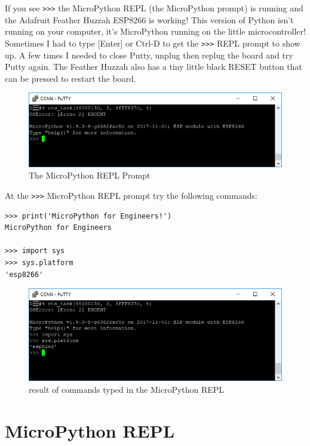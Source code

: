 \documentclass{book}
\makeatletter
\def\maxwidth{\ifdim\Gin@nat@width>\linewidth\linewidth
    \else\Gin@nat@width\fi}
\let\Oldincludegraphics\includegraphics
\renewcommand{\includegraphics}[1]{\Oldincludegraphics[width=.8\maxwidth]{#1}}
\makeatother
\begin{document}
If you see \lstinline!>>>! the MicroPython REPL (the MicroPython prompt)
is running and the Adafruit Feather Huzzah ESP8266 is working! This
version of Python isn't running on your computer, it's MicroPython
running on the little microcontroller! Sometimes I had to type
{[}Enter{]} or Ctrl-D to get the \lstinline!>>>! REPL prompt to show up.
A few times I needed to close Putty, unplug then replug the board and
try Putty again. The Feather Huzzah also has a tiny little black RESET
button that can be pressed to restart the board.

\begin{figure}
\centering
\includegraphics{images/REPL_prompt.PNG}
\caption{The MicroPython REPL Prompt}
\end{figure}

At the \lstinline!>>>! MicroPython REPL prompt try the following
commands:

\begin{lstlisting}
>>> print('MicroPython for Engineers!')
MicroPython for Engineers

>>> import sys
>>> sys.platform
'esp8266'
\end{lstlisting}

\begin{figure}
\centering
\includegraphics{images/sys_dot_platform.PNG}
\caption{result of commands typed in the MicroPython REPL}
\end{figure}

    \section{MicroPython REPL}\label{micropython-repl}
\end{document}

